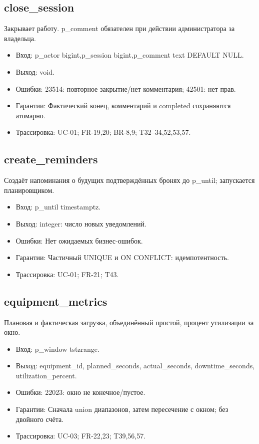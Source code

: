 \subsection{close\_\allowbreak{}session}
Закрывает работу. p\_\allowbreak{}comment обязателен при действии администратора за владельца.
\begin{itemize}
\item Вход: p\_\allowbreak{}actor bigint,p\_\allowbreak{}session bigint,p\_\allowbreak{}comment text DEFAULT NULL.
\item Выход: void.
\item Ошибки: 23514: повторное закрытие/\allowbreak{}нет комментария; 42501: нет прав.
\item Гарантии: Фактический конец, комментарий и completed сохраняются атомарно.
\item Трассировка: UC-01; FR-19,20; BR-8,9; T32–34,52,53,57.
\end{itemize}
\subsection{create\_\allowbreak{}reminders}
Создаёт напоминания о будущих подтверждённых бронях до p\_\allowbreak{}until; запускается планировщиком.
\begin{itemize}
\item Вход: p\_\allowbreak{}until timestamptz.
\item Выход: integer: число новых уведомлений.
\item Ошибки: Нет ожидаемых бизнес-ошибок.
\item Гарантии: Частичный UNIQUE и ON CONFLICT: идемпотентность.
\item Трассировка: UC-01; FR-21; T43.
\end{itemize}
\subsection{equipment\_\allowbreak{}metrics}
Плановая и фактическая загрузка, объединённый простой, процент утилизации за окно.
\begin{itemize}
\item Вход: p\_\allowbreak{}window tstzrange.
\item Выход: equipment\_\allowbreak{}id, planned\_\allowbreak{}seconds, actual\_\allowbreak{}seconds, downtime\_\allowbreak{}seconds, utilization\_\allowbreak{}percent.
\item Ошибки: 22023: окно не конечное/\allowbreak{}пустое.
\item Гарантии: Сначала union диапазонов, затем пересечение с окном; без двойного счёта.
\item Трассировка: UC-03; FR-22,23; T39,56,57.
\end{itemize}

